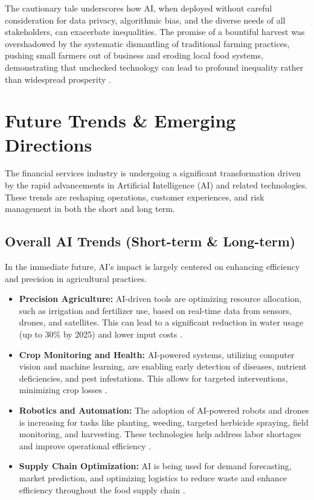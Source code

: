 The cautionary tale underscores how AI, when deployed without careful consideration for data privacy, algorithmic bias, and the diverse needs of all stakeholders, can exacerbate inequalities. The promise of a bountiful harvest was overshadowed by the systematic dismantling of traditional farming practices, pushing small farmers out of business and eroding local food systems, demonstrating that unchecked technology can lead to profound inequality rather than widespread prosperity \cite{Medium_AgriVision_Failure}.

\section{Future Trends \& Emerging Directions}

The financial services industry is undergoing a significant transformation driven by the rapid advancements in Artificial Intelligence (AI) and related technologies. These trends are reshaping operations, customer experiences, and risk management in both the short and long term.

\subsection{Overall AI Trends (Short-term \& Long-term)}
In the immediate future, AI's impact is largely centered on enhancing efficiency and precision in agricultural practices.
\begin{itemize}
    \item \textbf{Precision Agriculture:} AI-driven tools are optimizing resource allocation, such as irrigation and fertilizer use, based on real-time data from sensors, drones, and satellites. This can lead to a significant reduction in water usage (up to 30\% by 2025) and lower input costs \cite{Farmonaut_FutureTrends_1, ArtSmart_FutureTrends}.
    \item \textbf{Crop Monitoring and Health:} AI-powered systems, utilizing computer vision and machine learning, are enabling early detection of diseases, nutrient deficiencies, and pest infestations. This allows for targeted interventions, minimizing crop losses \cite{MedCraveOnline_FutureTrends, SwissCognitive_FutureTrends}.
    \item \textbf{Robotics and Automation:} The adoption of AI-powered robots and drones is increasing for tasks like planting, weeding, targeted herbicide spraying, field monitoring, and harvesting. These technologies help address labor shortages and improve operational efficiency \cite{Preprints_FutureTrends, HokuyoUSA_FutureTrends}.
    \item \textbf{Supply Chain Optimization:} AI is being used for demand forecasting, market prediction, and optimizing logistics to reduce waste and enhance efficiency throughout the food supply chain \cite{FarmingFirst_FutureTrends}.
\end{itemize}

